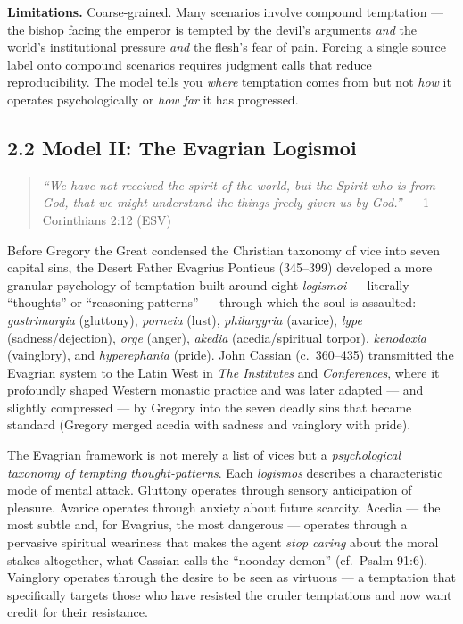 \documentclass[10pt, letterpaper, twocolumn]{article}
\begin{document}
\textbf{Limitations.} Coarse-grained. Many scenarios involve compound temptation --- the bishop facing the emperor is tempted by the devil's arguments \emph{and} the world's institutional pressure \emph{and} the flesh's fear of pain. Forcing a single source label onto compound scenarios requires judgment calls that reduce reproducibility. The model tells you \emph{where} temptation comes from but not \emph{how} it operates psychologically or \emph{how far} it has progressed.

\subsection*{2.2 Model II: The Evagrian Logismoi}\label{model-ii-the-evagrian-logismoi}

\begin{quote}
\emph{``We have not received the spirit of the world, but the Spirit who is from God, that we might understand the things freely given us by God.''} --- 1 Corinthians 2:12 (ESV)
\end{quote}

Before Gregory the Great condensed the Christian taxonomy of vice into seven capital sins, the Desert Father Evagrius Ponticus (345--399) developed a more granular psychology of temptation built around eight \emph{logismoi} --- literally ``thoughts'' or ``reasoning patterns'' --- through which the soul is assaulted: \emph{gastrimargia} (gluttony), \emph{porneia} (lust), \emph{philargyria} (avarice), \emph{lype} (sadness/dejection), \emph{orge} (anger), \emph{akedia} (acedia/spiritual torpor), \emph{kenodoxia} (vainglory), and \emph{hyperephania} (pride). John Cassian (c.~360--435) transmitted the Evagrian system to the Latin West in \emph{The Institutes} and \emph{Conferences}, where it profoundly shaped Western monastic practice and was later adapted --- and slightly compressed --- by Gregory into the seven deadly sins that became standard (Gregory merged acedia with sadness and vainglory with pride).

The Evagrian framework is not merely a list of vices but a \emph{psychological taxonomy of tempting thought-patterns}. Each \emph{logismos} describes a characteristic mode of mental attack. Gluttony operates through sensory anticipation of pleasure. Avarice operates through anxiety about future scarcity. Acedia --- the most subtle and, for Evagrius, the most dangerous --- operates through a pervasive spiritual weariness that makes the agent \emph{stop caring} about the moral stakes altogether, what Cassian calls the ``noonday demon'' (cf.~Psalm 91:6). Vainglory operates through the desire to be seen as virtuous --- a temptation that specifically targets those who have resisted the cruder temptations and now want credit for their resistance.
\end{document}
